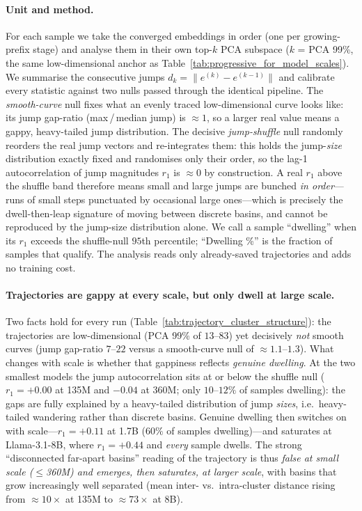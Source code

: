 \paragraph{Unit and method.} For each sample we take the converged embeddings in order (one per growing-prefix stage) and analyse them in their own top-$k$ PCA subspace ($k$ = PCA 99\%, the same low-dimensional anchor as Table~\ref{tab:progressive_for_model_scales}). We summarise the consecutive jumps $d_k = \|e^{(k)}-e^{(k-1)}\|$ and calibrate every statistic against two nulls passed through the identical pipeline. The \emph{smooth-curve} null fixes what an evenly traced low-dimensional curve looks like: its jump gap-ratio (max\,/\,median jump) is $\approx 1$, so a larger real value means a gappy, heavy-tailed jump distribution. The decisive \emph{jump-shuffle} null randomly reorders the real jump vectors and re-integrates them: this holds the jump-\emph{size} distribution exactly fixed and randomises only their order, so the lag-1 autocorrelation of jump magnitudes $r_1$ is $\approx 0$ by construction. A real $r_1$ above the shuffle band therefore means small and large jumps are bunched \emph{in order}---runs of small steps punctuated by occasional large ones---which is precisely the dwell-then-leap signature of moving between discrete basins, and cannot be reproduced by the jump-size distribution alone. We call a sample ``dwelling'' when its $r_1$ exceeds the shuffle-null $95$th percentile; ``Dwelling \%'' is the fraction of samples that qualify. The analysis reads only already-saved trajectories and adds no training cost.

\paragraph{Trajectories are gappy at every scale, but only dwell at large scale.} Two facts hold for every run (Table~\ref{tab:trajectory_cluster_structure}): the trajectories are low-dimensional (PCA 99\% of $13$--$83$) yet decisively \emph{not} smooth curves (jump gap-ratio $7$--$22$ versus a smooth-curve null of $\approx 1.1$--$1.3$). What changes with scale is whether that gappiness reflects \emph{genuine dwelling}. At the two smallest models the jump autocorrelation sits at or below the shuffle null ($r_1 = +0.00$ at 135M and $-0.04$ at 360M; only $10$--$12\%$ of samples dwelling): the gaps are fully explained by a heavy-tailed distribution of jump \emph{sizes}, i.e.\ heavy-tailed wandering rather than discrete basins. Genuine dwelling then switches on with scale---$r_1 = +0.11$ at 1.7B ($60\%$ of samples dwelling)---and saturates at Llama-3.1-8B, where $r_1 = +0.44$ and \emph{every} sample dwells. The strong ``disconnected far-apart basins'' reading of the trajectory is thus \emph{false at small scale ($\le$360M) and emerges, then saturates, at larger scale}, with basins that grow increasingly well separated (mean inter- vs.\ intra-cluster distance rising from ${\approx}10\times$ at 135M to ${\approx}73\times$ at 8B).

